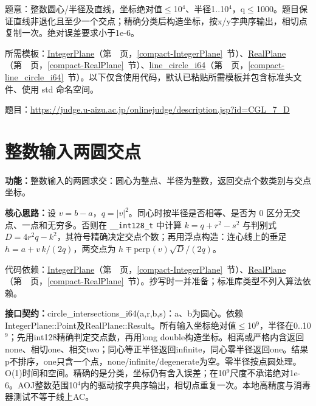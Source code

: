 \label{usage-example-151}

题意：整数圆心/半径及直线，坐标绝对值$\le$10$^{4}$、半径1..10$^{4}$，q$\le$1000。题目保证直线非退化且至少一个交点；精确分类后构造坐标，按x/y字典序输出，相切点复制一次。绝对误差要求小于1e-6。

所需模板：\hyperref[compact-IntegerPlane]{IntegerPlane}（第~\pageref{compact-IntegerPlane}~页，\ref{compact-IntegerPlane}~节）、\hyperref[compact-RealPlane]{RealPlane}（第~\pageref{compact-RealPlane}~页，\ref{compact-RealPlane}~节）、\hyperref[compact-line_circle_i64]{line\_\allowbreak{}circle\_\allowbreak{}i64}（第~\pageref{compact-line_circle_i64}~页，\ref{compact-line_circle_i64}~节）。以下仅含使用代码，默认已粘贴所需模板并包含标准头文件、使用 std 命名空间。

题目：\url{https://judge.u-aizu.ac.jp/onlinejudge/description.jsp?id=CGL_7_D}



\Needspace{516pt}

\section{整数输入两圆交点}\label{compact-circle_intersections_i64}

\noindent\textbf{功能：}\allowbreak 整数输入的两圆求交：圆心为整点、半径为整数，返回交点个数类别与交点坐标。

\textbf{核心思路：}\allowbreak 设 $v=b-a$，$q=|v|^2$。同心时按半径是否相等、是否为 0 区分无交点、一点和无穷多。否则在 \texttt{\_\_int128\_t} 中计算 $k=q+r^2-s^2$ 与判别式 $D=4r^2q-k^2$，其符号精确决定交点个数；再用浮点构造：连心线上的垂足 $h=a+v\,k/(2q)$，两交点为 $h\mp\mathrm{perp}(v)\sqrt D/(2q)$。

代码依赖：\hyperref[compact-IntegerPlane]{IntegerPlane}（第~\pageref{compact-IntegerPlane}~页，\ref{compact-IntegerPlane}~节）、\hyperref[compact-RealPlane]{RealPlane}（第~\pageref{compact-RealPlane}~页，\ref{compact-RealPlane}~节）。抄写时一并准备；标准库类型不列入算法依赖。

{\sloppy{}\noindent\textbf{接口契约：}circle\_intersections\_i64(a,r,b,s)：a、b为圆心。依赖IntegerPlane::Point及RealPlane::Result。所有输入坐标绝对值$\le$10$^{9}$，半径在0..10$^{9}$；先用int128精确判定交点数，再用long double构造坐标。相离或严格内含返回none、相切one、相交two；同心等正半径返回infinite，同心零半径返回one。结果p不排序，one只含一个点，none/infinite/degenerate为空。零半径按点圆处理。O(1)时间和空间。精确的是分类，坐标仍有舍入误差；在10$^{9}$尺度不承诺绝对1e-6。AOJ整数范围10$^{4}$内的驱动按字典序输出，相切点重复一次。本地高精度与消毒器测试不等于线上AC。\par}

